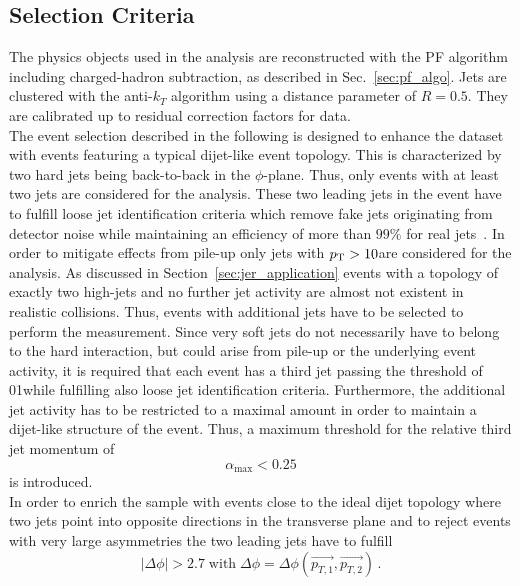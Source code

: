 \subsection{Selection Criteria}
\label{subsec:jer_sel_cuts}
The physics objects used in the analysis are reconstructed with the PF algorithm including charged-hadron subtraction, as described in Sec.~\ref{sec:pf_algo}. Jets are clustered with the anti-$k_T$ algorithm using a distance parameter of $R=0.5$. They are calibrated up to residual correction factors for data. \\
The event selection described in the following is designed to enhance the dataset with events featuring a typical dijet-like event topology. This is characterized by two hard jets being back-to-back in the $\phi$-plane. Thus, only events with at least two jets are considered for the analysis. These two leading jets in the event have to fulfill loose jet identification criteria which remove fake jets originating from detector noise while maintaining an efficiency of more than $99\%$ for real jets~\cite{CMS-PAS-JME-09-008, CMS-PAS-JME-10-003}. In order to mitigate effects from pile-up only jets with $p_{\text{T}} > 10$\gev are considered for the analysis. As discussed in Section~\ref{sec:jer_application} events with a topology of exactly two high-\pt jets and no further jet activity are almost not existent in realistic collisions. Thus, events with additional jets have to be selected to perform the measurement. Since very soft jets do not necessarily have to belong to the hard interaction, but could arise from pile-up or the underlying event activity, it is required that each event has a third jet passing the \pt threshold of 01\gev while fulfilling also loose jet identification criteria. Furthermore, the additional jet activity has to be restricted to a maximal amount in order to maintain a dijet-like structure of the event. Thus, a maximum threshold for the relative third jet momentum of 
\begin{equation*}
\alpha_\mathrm{max} < 0.25 
\end{equation*}
is introduced.\\
In order to enrich the sample with events close to the ideal dijet topology where two jets point into opposite directions in the transverse plane and to reject events with very large asymmetries the two leading jets have to fulfill 
\begin{equation}
|\Delta \phi| > 2.7 \; \mathrm{with} \; \Delta \phi = \Delta \phi(\vec{p_{T,1}}, \vec{p_{T,2}}) \, .
\end{equation}  
